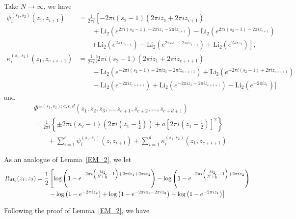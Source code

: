 \documentclass[10pt,a4paper]{article}
\newcommand{\lt}{\left}
\newcommand{\rt}{\right}
\def \Li{\operatorname{Li_2}}
\begin{document}
Take $N \to \infty$, we have
\begin{align*}
\psi_{i}^{(s_1,s_2)} (z_1, z_{i+1})
&= \frac{1}{2\pi i} \lt[ - 2\pi i(s_2 -1)(2\pi i z_1 + 2\pi i z_{i+1} )  \rt.\\
&\qquad + \Li\lt(e^{2\pi i (s_2-1) - 2\pi i z_1 - 2\pi i z_{i+1}}\rt) - \Li\lt( e^{2\pi i (s_2-1) - 2\pi i z_{i+1} }\rt) \\
&\qquad \lt. + \Li \lt(e^{2\pi i z_{i+1}}\rt) - \Li\lt(e^{2\pi iz_1+ 2\pi i z_{i+1}}\rt) + \Li\lt(e^{2\pi i z_1}\rt) \rt] ,\\
\kappa_i^{(s_1,s_2)}(z_1,z_{c+i+1}) 
&= \frac{1}{2\pi i} [ 2\pi i(s_2 -1)(2\pi i z_1 + 2\pi i z_{c+i+1} ) \\
&\qquad - \Li\lt(e^{-2\pi i (s_2-1) + 2\pi i z_1 + 2\pi i z_{c+i+1}}\rt) + \Li\lt( e^{-2\pi i (s_2-1) + 2\pi i z_{c+i+1} }\rt) \\
&\qquad - \Li \lt(e^{-2\pi i z_{c+i+1}}\rt) + \Li\lt(e^{-2\pi iz_1- 2\pi i z_{c+i+1}}\rt) - \Li\lt(e^{-2\pi i z_1}\rt) ]
\end{align*}
and
\begin{align*}
&\Phi^{\pm (s_1,s_2);a,c,d}  (z_1, z_2,z_3, \dots, z_{c+1}, z_{c+2},\dots, z_{c+d+1})  \\
&=  \frac{1}{2\pi i} \lt\{  \pm2\pi i  \lt( s_2 - 1\rt) \lt(2\pi i \lt(z_1 -\frac{1}{2} \rt)\rt)
 + a \lt[2\pi i \lt(z_1-\frac{1}{2} \rt) \rt]^2  \rt\} \\
&\qquad + \sum_{i=1}^c \psi^{(s_1,s_2)}_i (z,z_{i+1}) + \sum_{i=1}^d \kappa_i^{(s_1,s_2)}(z_1,z_{c+i+1})
\end{align*}

As an analogue of Lemma~\ref{EM_2}, we let
\begin{align}
R_{M_2}(z_1,z_2) 
&= \frac{1}{2}\lt[ \log\lt(1-e^{-2\pi i \lt(\frac{M_2}{N+\frac{1}{2}}-1\rt) + 2\pi i z_1 + 2\pi i z_2 }\rt)
- \log\lt(1-e^{-2\pi i \lt(\frac{M_2}{N+\frac{1}{2}}-1\rt) + 2\pi i z_2 } \rt) \rt.\notag\\
&\lt.\qquad - \log\lt(1- e^{-2\pi i z_2 } \rt)
+ \log\lt(1- e^{-2\pi iz_1- 2\pi i z_2} \rt) 
- \log\lt(1-  e^{-2\pi i z_1 } \rt) \rt]
\end{align}

Following the proof of Lemma~\ref{EM_2}, we have
\end{document}
